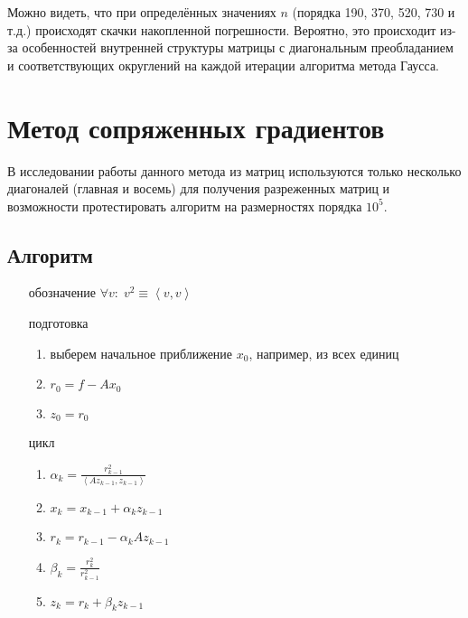\documentclass[russian, english]{article}
\newcommand{\mydot}[2]{\left\langle#1,#2\right\rangle}
\begin{document}
Можно видеть, что при определённых значениях $n$ (порядка 190, 370, 520, 730 и т.д.) происходят скачки накопленной погрешности. Вероятно, это происходит из-за особенностей внутренней структуры матрицы с диагональным преобладанием и соответствующих округлений на каждой итерации алгоритма метода Гаусса.

\section{Метод сопряженных градиентов}
В исследовании работы данного метода из матриц используются только несколько диагоналей (главная и восемь) для получения разреженных матриц и возможности протестировать алгоритм на размерностях порядка $10^5$.

\subsection{Алгоритм}
\begin{itemize}
	\item[обозначение] $\forall v:\; v^2\equiv \mydot{v}{v}$
	\item[подготовка]
		\begin{enumerate}
			\item выберем начальное приближение $x_0$, например, из всех единиц
			\item $r_0 = f - Ax_0$
			\item $z_0 = r_0$
		\end{enumerate}
	\item[цикл]
		\begin{enumerate}
			\item $\alpha_k=\frac{r_{k-1}^2}{\mydot{Az_{k-1}}{z_{k-1}}}$
			\item $x_k=x_{k-1}+\alpha_kz_{k-1}$
			\item $r_k=r_{k-1}-\alpha_kAz_{k-1}$
			\item $\beta_k=\frac{r_k^2}{r_{k-1}^2}$
			\item $z_k=r_k+\beta_kz_{k-1}$
		\end{enumerate}
\end{itemize}
\end{document}
